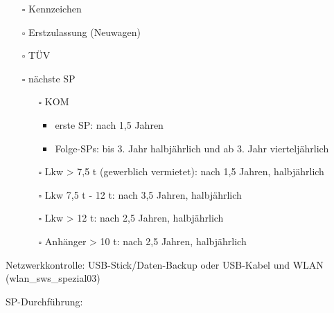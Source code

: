 \documentclass{vorlage-design-main}
\begin{document}
\begin{itemize}
\begin{itemize}
  \item[$\square$]
    Kennzeichen
  \item[$\square$]
    Erstzulassung (Neuwagen)
  \item[$\square$]
    TÜV
  \item[$\square$]
    nächste SP

    \begin{itemize}
    
    \item[$\square$]
      KOM

      \begin{itemize}
      
      \item
        erste SP: nach 1,5 Jahren
      \item
        Folge-SPs: bis 3. Jahr halbjährlich und ab 3. Jahr
        vierteljährlich
      \end{itemize}
    \item[$\square$]
      Lkw \textgreater{} 7,5 t (gewerblich vermietet): nach 1,5 Jahren,
      halbjährlich
    \item[$\square$]
      Lkw 7,5 t - 12 t: nach 3,5 Jahren, halbjährlich
    \item[$\square$]
      Lkw \textgreater{} 12 t: nach 2,5 Jahren, halbjährlich
    \item[$\square$]
      Anhänger \textgreater{} 10 t: nach 2,5 Jahren, halbjährlich
    \end{itemize}
  \end{itemize}
\end{itemize}

Netzwerkkontrolle: USB-Stick/Daten-Backup oder USB-Kabel und WLAN
(wlan\_sws\_spezial03)

\newpage

SP-Durchführung:
\end{document}

